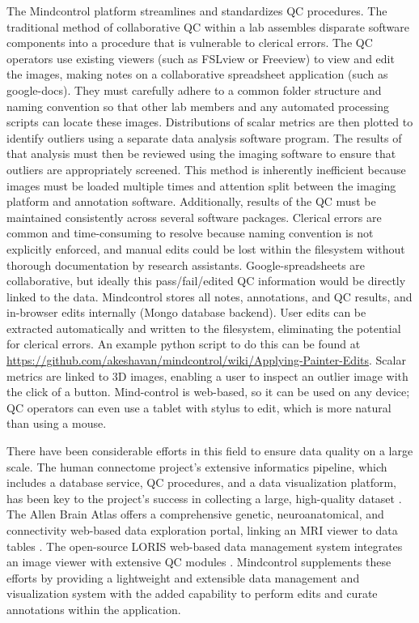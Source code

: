 The Mindcontrol platform streamlines and standardizes QC procedures. The traditional method of collaborative QC within a lab assembles disparate software components into a procedure that is vulnerable to clerical errors. The QC operators use existing viewers (such as FSLview or Freeview) to view and edit the images, making notes on a collaborative spreadsheet application (such as google-docs). They must carefully adhere to a common folder structure and naming convention so that other lab members and any automated processing scripts can locate these images. Distributions of scalar metrics are then plotted to identify outliers using a separate data analysis software program. The results of that analysis must then be reviewed using the imaging software to ensure that outliers are appropriately screened. This method is inherently inefficient because images must be loaded multiple times and attention split between the imaging platform and annotation software. Additionally, results of the QC must be maintained consistently across several software packages. Clerical errors are common and time-consuming to resolve because naming convention is not explicitly enforced, and manual edits could be lost within the filesystem without thorough documentation by research assistants. Google-spreadsheets are collaborative, but ideally this pass/fail/edited QC information would be directly linked to the data. Mindcontrol stores all notes, annotations, and QC results, and in-browser edits internally (Mongo database backend). User edits can be extracted automatically and written to the filesystem, eliminating the potential for clerical errors. An example python script to do this can be found at \href{http://}{https://github.com/akeshavan/mindcontrol/wiki/Applying-Painter-Edits}. Scalar metrics are linked to 3D images, enabling a user to inspect an outlier image with the click of a button. Mind-control is web-based, so it can be used on any device; QC operators can even use a tablet with stylus to edit, which is more natural than using a mouse.

There have been considerable efforts in this field to ensure data quality on a large scale. The human connectome project's extensive informatics pipeline, which includes a database service, QC procedures, and a data visualization platform, has been key to the project's success in collecting a large, high-quality dataset \cite{Marcus_2013}. The Allen Brain Atlas offers a comprehensive genetic, neuroanatomical, and connectivity web-based data exploration portal, linking an MRI viewer to data tables \cite{Sunkin_2012}. The open-source LORIS web-based data management system integrates an image viewer with extensive QC modules \cite{Das_2012}. Mindcontrol supplements these efforts by providing a lightweight and extensible data management and visualization system with the added capability to perform edits and curate annotations within the application. 


